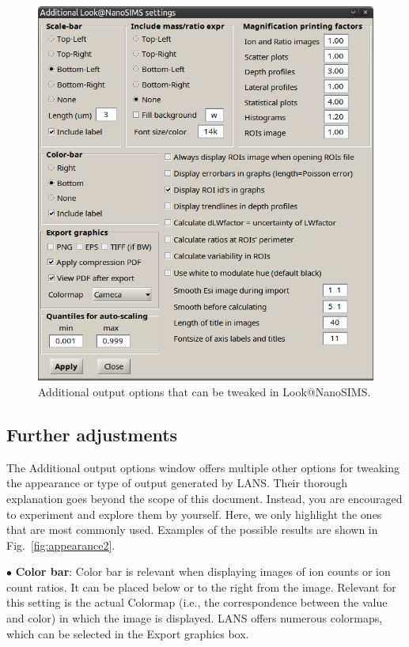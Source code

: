 \documentclass[a4paper, 11pt]{article}
\newcommand{\lans}[1]{{\color{magenta}#1}}
\newcommand{\lanscb}[1]{{\color{darkgreen}#1}}
\newcommand{\lanstf}[1]{{\color{cyan}#1}}
\newcommand\bul{\vskip5pt\noindent$\bullet${ }}
\newcommand\bb[1]{\textbf{#1}}
\begin{document}
\begin{figure}[!t]
\centering
\includegraphics[scale=0.35]{figs1/LANS-tweaking}
\caption{\label{fig:appearance}%
Additional output options that can be tweaked in Look@NanoSIMS.}
\end{figure}

\subsection{Further adjustments}
\label{sec:appearance1}

The \lans{Additional output options} window offers multiple other options for tweaking the appearance or type of output generated by LANS. Their thorough explanation goes beyond the scope of this document. Instead, you are encouraged to experiment and explore them by yourself. Here, we only highlight the ones that are most commonly used. Examples of the possible results are shown in Fig.~\ref{fig:appearance2}.

\bul \lanscb{\bb{Color bar}}: Color bar is relevant when displaying images of ion counts or ion count ratios. It can be placed below or to the right from the image. Relevant for this setting is the actual \lans{Colormap} (i.e., the correspondence between the value and color) in which the image is displayed. LANS offers numerous colormaps, which can be selected in the \lanstf{Export graphics} box.
\end{document}
